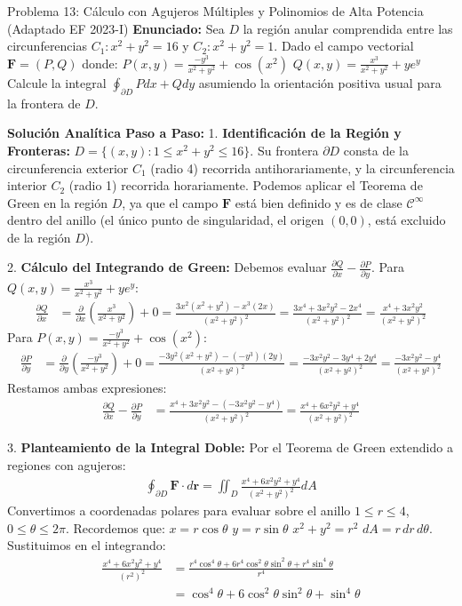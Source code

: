 \documentclass[11pt,a4paper]{article}
\begin{document}
\begin{ejerciciobox}{Problema 13: Cálculo con Agujeros Múltiples y Polinomios de Alta Potencia (Adaptado EF 2023-I)}
\textbf{Enunciado:}
Sea $D$ la región anular comprendida entre las circunferencias $C_1: x^2+y^2=16$ y $C_2: x^2+y^2=1$.
Dado el campo vectorial $\mathbf{F} = (P, Q)$ donde:
$P(x,y) = \frac{-y^3}{x^2+y^2} + \cos(x^2)$
$Q(x,y) = \frac{x^3}{x^2+y^2} + y e^y$
Calcule la integral $\oint_{\partial D} P dx + Q dy$ asumiendo la orientación positiva usual para la frontera de $D$.

\textbf{Solución Analítica Paso a Paso:}
1. \textbf{Identificación de la Región y Fronteras:}
$D = \{(x,y) : 1 \le x^2+y^2 \le 16\}$.
Su frontera $\partial D$ consta de la circunferencia exterior $C_1$ (radio 4) recorrida antihorariamente, y la circunferencia interior $C_2$ (radio 1) recorrida horariamente.
Podemos aplicar el Teorema de Green en la región $D$, ya que el campo $\mathbf{F}$ está bien definido y es de clase $\mathcal{C}^\infty$ dentro del anillo (el único punto de singularidad, el origen $(0,0)$, está excluido de la región $D$).

2. \textbf{Cálculo del Integrando de Green:}
Debemos evaluar $\frac{\partial Q}{\partial x} - \frac{\partial P}{\partial y}$.
Para $Q(x,y) = \frac{x^3}{x^2+y^2} + y e^y$:
\begin{align*}
\frac{\partial Q}{\partial x} &= \frac{\partial}{\partial x} \left( \frac{x^3}{x^2+y^2} \right) + 0 = \frac{3x^2(x^2+y^2) - x^3(2x)}{(x^2+y^2)^2} = \frac{3x^4 + 3x^2y^2 - 2x^4}{(x^2+y^2)^2} = \frac{x^4 + 3x^2y^2}{(x^2+y^2)^2}
\end{align*}
Para $P(x,y) = \frac{-y^3}{x^2+y^2} + \cos(x^2)$:
\begin{align*}
\frac{\partial P}{\partial y} &= \frac{\partial}{\partial y} \left( \frac{-y^3}{x^2+y^2} \right) + 0 = \frac{-3y^2(x^2+y^2) - (-y^3)(2y)}{(x^2+y^2)^2} = \frac{-3x^2y^2 - 3y^4 + 2y^4}{(x^2+y^2)^2} = \frac{-3x^2y^2 - y^4}{(x^2+y^2)^2}
\end{align*}
Restamos ambas expresiones:
\begin{align*}
\frac{\partial Q}{\partial x} - \frac{\partial P}{\partial y} &= \frac{x^4 + 3x^2y^2 - (-3x^2y^2 - y^4)}{(x^2+y^2)^2} = \frac{x^4 + 6x^2y^2 + y^4}{(x^2+y^2)^2}
\end{align*}

3. \textbf{Planteamiento de la Integral Doble:}
Por el Teorema de Green extendido a regiones con agujeros:
\begin{align*}
\oint_{\partial D} \mathbf{F} \cdot d\mathbf{r} = \iint_D \frac{x^4 + 6x^2y^2 + y^4}{(x^2+y^2)^2} dA
\end{align*}
Convertimos a coordenadas polares para evaluar sobre el anillo $1 \le r \le 4$, $0 \le \theta \le 2\pi$.
Recordemos que:
$x = r\cos\theta$
$y = r\sin\theta$
$x^2+y^2 = r^2$
$dA = r \, dr \, d\theta$.
Sustituimos en el integrando:
\begin{align*}
\frac{x^4 + 6x^2y^2 + y^4}{(r^2)^2} &= \frac{r^4\cos^4\theta + 6r^4\cos^2\theta\sin^2\theta + r^4\sin^4\theta}{r^4} \\
&= \cos^4\theta + 6\cos^2\theta\sin^2\theta + \sin^4\theta
\end{align*}


\end{ejerciciobox}
\end{document}
